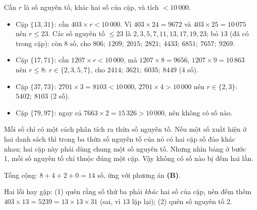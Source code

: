 {
Cần $r$ là số nguyên tố, khác hai số của cặp, và tích $<10\,000$.
\begin{itemize}[leftmargin=1.2em,itemsep=1pt,topsep=2pt]
\item Cặp $\{13,31\}$: cần $403\times r<10\,000$. Vì $403\times24=9672$ và $403\times25=10\,075$ nên $r\le23$.
Các số nguyên tố $\le23$ là $2,3,5,7,11,13,17,19,23$; bỏ $13$ (đã có trong cặp): còn $8$ số, cho
$806;\ 1209;\ 2015;\ 2821;\ 4433;\ 6851;\ 7657;\ 9269$.
\item Cặp $\{17,71\}$: cần $1207\times r<10\,000$, mà $1207\times8=9656$, $1207\times9=10\,863$ nên $r\le8$:
$r\in\{2,3,5,7\}$, cho $2414;\ 3621;\ 6035;\ 8449$ ($4$ số).
\item Cặp $\{37,73\}$: $2701\times3=8103<10\,000$, $2701\times4>10\,000$ nên $r\in\{2,3\}$: $5402;\ 8103$ ($2$ số).
\item Cặp $\{79,97\}$: ngay cả $7663\times2=15\,326>10\,000$, nên không có số nào.
\end{itemize}

\begin{proofbox}Mỗi số chỉ có một cách phân tích ra thừa số nguyên tố. Nếu một số xuất hiện ở hai danh sách thì
trong ba thừa số nguyên tố của nó có hai cặp số đảo khác nhau; hai cặp này phải dùng chung một số nguyên tố.
Nhưng nhìn bảng ở bước 1, mỗi số nguyên tố chỉ thuộc đúng một cặp. Vậy không có số nào bị đếm hai lần.\end{proofbox}
Tổng cộng: $8+4+2+0=14$ số, ứng với phương án \textbf{(B)}.
\begin{warnbox}Hai lỗi hay gặp: (1) quên rằng số thứ ba phải \emph{khác} hai số của cặp, nên đếm thêm
$403\times13=5239=13\times13\times31$ (sai, vì $13$ lặp lại); (2) quên số nguyên tố $2$.\end{warnbox}
}

